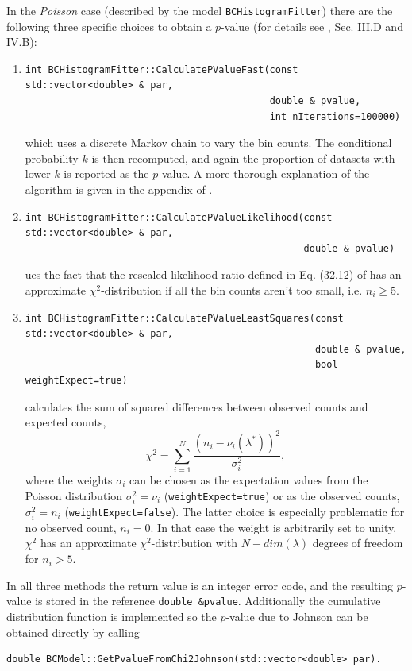 \documentclass[11pt, a4paper]{article}
\begin{document}
In the \textit{Poisson} case (described by the model \verb|BCHistogramFitter|)
there are the following three
specific choices to obtain a $p$-value
(for details see \cite{BAT_pValue}, Sec. III.D and IV.B):
\begin{enumerate}
\item
%
\begin{verbatim}
int BCHistogramFitter::CalculatePValueFast(const std::vector<double> & par,
                                           double & pvalue,
                                           int nIterations=100000)
\end{verbatim}
%
which uses a discrete Markov chain to vary the bin counts.
The conditional probability $k$ is then recomputed, and
again the proportion of datasets with lower $k$ is
reported as the $p$-value. A more thorough explanation
of the algorithm is given
in the appendix of \cite{BAT_pValue}.
\item
%
\begin{verbatim}
int BCHistogramFitter::CalculatePValueLikelihood(const std::vector<double> & par,
                                                 double & pvalue)
\end{verbatim}
%
ues the fact that the rescaled likelihood ratio defined in
Eq. (32.12) of \cite{PDGstatistics} has an approximate
$\chi^2$-distribution if all the bin counts aren't too small,
i.e. $n_i \ge 5$.

\item
%
\begin{verbatim}
int BCHistogramFitter::CalculatePValueLeastSquares(const std::vector<double> & par,
                                                   double & pvalue,
                                                   bool weightExpect=true)
\end{verbatim}
%
calculates the sum of squared differences between observed counts and
expected counts, $$\chi^2 = \sum_{i=1}^N \frac{\left(n_i -
\nu_i(\lambda^{*})\right)^2}{\sigma_i^2},$$ where the weights
$\sigma_i$ can be chosen as the expectation values from the Poisson
distribution $\sigma_i^2 = \nu_i$ (\verb|weightExpect=true|) or as the
observed counts, $\sigma_i^2 = n_i$ (\verb|weightExpect=false|).  The
latter choice is especially problematic for no observed count, $n_i
=0$. In that case the weight is arbitrarily set to unity.  $\chi^2$
has an approximate $\chi^2$-distribution with $N-dim(\lambda)$ degrees
of freedom for $n_i>5$.
\end{enumerate}
In all three methods the return value is an integer error code, and
the resulting $p$-value is stored in the reference
\verb|double &pvalue|.  Additionally the cumulative distribution
function is implemented so the $p$-value due to Johnson
\cite{Johnson_pValue} can be obtained directly by calling
\begin{verbatim}
double BCModel::GetPvalueFromChi2Johnson(std::vector<double> par).
\end{verbatim}
\end{document}
